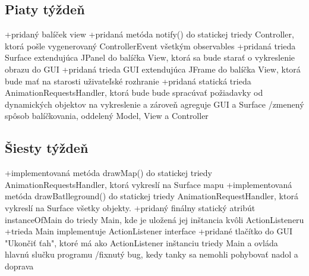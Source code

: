 \documentclass[12pt,oneside,slovak,a4paper]{article}
\begin{document}
\subsection{Piaty týždeň}
+pridaný balíček view\newline
+pridaná metóda notify() do statickej triedy Controller, ktorá pošle vygenerovaný ControllerEvent všetkým observables\newline
+pridaná trieda Surface extendujúca JPanel do balíčka View, ktorá sa bude starať o vykreslenie obrazu do GUI\newline
+pridaná trieda GUI extendujúca JFrame do balíčka View, ktorá bude mať na starosti uživateľské rozhranie\newline
+pridaná statická trieda AnimationRequestsHandler, ktorá bude bude spracúvať požiadavky od dynamických objektov na vykreslenie a zároveň agreguje GUI a Surface\newline
\newline
/zmenený spôsob balíčkovania, oddelený Model, View a Controller\newline
\subsection{Šiesty týždeň}
+implementovaná metóda drawMap() do statickej triedy AnimationRequestsHandler, ktorá vykreslí na Surface mapu\newline
+implementovaná metóda drawBatlleground() do statickej triedy AnimationRequestHandler, ktorá vykreslí na Surface všetky objekty.\newline
+pridaný finálny statický atribút instanceOfMain do triedy Main, kde je uložená jej inštancia kvôli ActionListeneru\newline
+trieda Main implementuje ActionListener interface\newline
+pridané tlačítko do GUI "Ukončiť ťah", ktoré má ako ActionListener inštanciu triedy Main a ovláda hlavnú slučku programu\newline
\newline
/fixnutý bug, kedy tanky sa nemohli pohybovať nadol a doprava\newline
\end{document}

